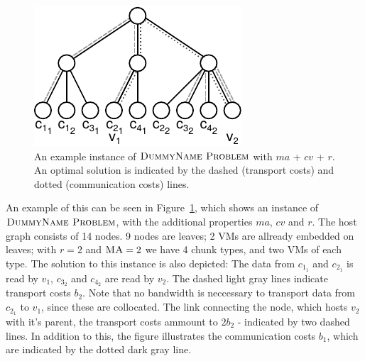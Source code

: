 \documentclass[9pt,twocolumn]{scrartcl}
\newcommand{\Problem}{\textsc{DummyName Problem}}
\newcommand{\MaFactor}{\ensuremath{\textsc{MA}}}
\newcommand{\RedundancyFactor}{\ensuremath{r}}
\newcommand{\VirtualNode}{v}
\newcommand{\achunk}{\ensuremath{c}}
\newcommand{\CostCom}{\ensuremath{b_1}}
\newcommand{\CostTrans}{\ensuremath{b_2}}
\begin{document}
\begin{appendix}
\begin{figure}[htbp]
\includegraphics[width =\columnwidth]{figs/model_ma_r_cv}
\caption{An example instance of $\Problem$ with $ma$ + $cv$ + $r$. An
optimal solution is indicated by the dashed (transport costs) and dotted
(communication costs) lines. }
\label{fig:model_combined}
\end{figure}

An example of this can be seen in Figure~\ref{fig:model_combined}, which shows
an instance of $\Problem$, with the additional properties $ma$, $cv$ and $r$.
The host graph consists of 14 nodes. 9 nodes are leaves; 2 VMs are allready
embedded on leaves; with $\RedundancyFactor = 2$ and $\MaFactor = 2$ we have 4
chunk types, and two VMs of each type. The solution to this instance is also
depicted: The data from $\achunk_{1_1}$ and $\achunk_{2_1}$ is read by
$\VirtualNode_1$, $\achunk_{3_2}$ and $\achunk_{4_2}$ are read by
$\VirtualNode_2$. The dashed light gray lines indicate transport
costs $\CostTrans$. Note that no bandwidth is neccessary to transport data from
$\achunk_{2_1}$ to $\VirtualNode_1$, since these are collocated. The link
connecting the node, which hosts $\VirtualNode_2$ with it's parent, the
transport costs ammount to $2 \CostTrans$ - indicated by two dashed lines. In
addition to this, the figure illustrates the communication costs $\CostCom$,
which are indicated by the dotted dark gray line.



\end{appendix}
\end{document}
